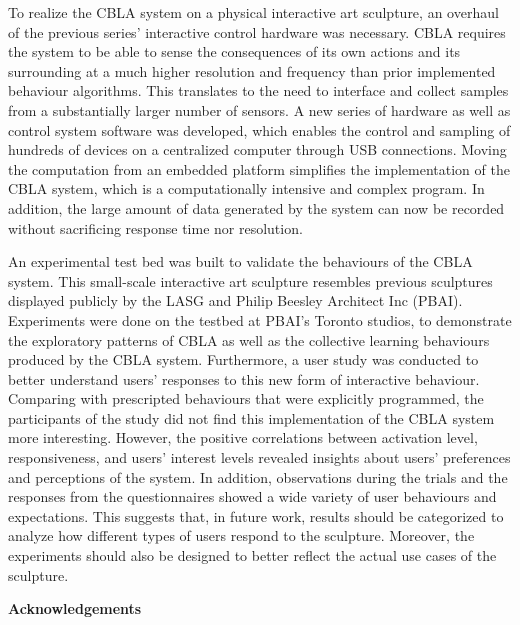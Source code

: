 To realize the CBLA system on a physical interactive art sculpture, an overhaul of the previous series' interactive control hardware was necessary. CBLA requires the system to be able to sense the consequences of its own actions and its surrounding at a much higher resolution and frequency than prior implemented behaviour algorithms. This translates to the need to interface and collect samples from a substantially larger number of sensors. A new series of hardware as well as control system software was developed, which enables the control and sampling of hundreds of devices on a centralized computer through USB connections. Moving the computation from an embedded platform simplifies the implementation of the CBLA system, which is a computationally intensive and complex program. In addition, the large amount of data generated by the system can now be recorded without sacrificing response time nor resolution.  

An experimental test bed was built to validate the behaviours of the CBLA system. This small-scale interactive art sculpture resembles previous sculptures displayed publicly by the LASG and Philip Beesley Architect Inc (PBAI). Experiments were done on the testbed at PBAI's Toronto studios, to demonstrate the exploratory patterns of CBLA as well as the collective learning behaviours produced by the CBLA system. Furthermore, a user study was conducted to better understand users' responses to this new form of interactive behaviour. Comparing with prescripted behaviours that were explicitly programmed, the participants of the study did not find this implementation of the CBLA system more interesting. However, the positive correlations between activation level, responsiveness, and users' interest levels revealed insights about users' preferences and perceptions of the system. In addition, observations during the trials and the responses from the questionnaires showed a wide variety of user behaviours and expectations. This suggests that, in future work, results should be categorized to analyze how different types of users respond to the sculpture. Moreover, the experiments should also be designed to better reflect the actual use cases of the sculpture. 



\cleardoublepage


\begin{center}\textbf{Acknowledgements}\end{center}


